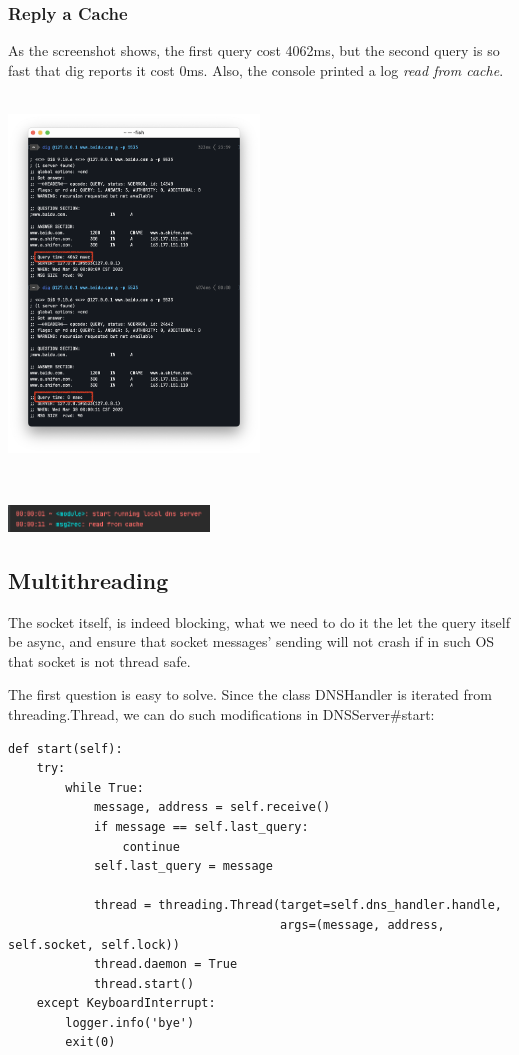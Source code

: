 \documentclass[onecolumn, oneside, ctexart]{SUSTechHomework}
\begin{document}
\subsubsection{Reply a Cache}
\label{reply a cache}
As the screenshot shows, the first query cost 4062ms, but the second query is so fast that dig reports it cost 0ms. Also, the console printed a log \emph{read from cache}.\\~\\
\centerline{\includegraphics[width=0.5\textwidth]{fig/p112}}\\
\centerline{\includegraphics[width=0.4\textwidth]{fig/p113}}

\subsection{Multithreading}
The socket itself, is indeed blocking, what we need to do it the let the query itself be async, and ensure that socket messages' sending will not crash if in such OS that socket is not thread safe.
\par The first question is easy to solve. Since the class DNSHandler is iterated from threading.Thread, we can do such modifications in DNSServer\#start:
\begin{verbatim}
def start(self):
    try:
        while True:
            message, address = self.receive()
            if message == self.last_query:
                continue
            self.last_query = message

            thread = threading.Thread(target=self.dns_handler.handle,
                                      args=(message, address, self.socket, self.lock))
            thread.daemon = True
            thread.start()
    except KeyboardInterrupt:
        logger.info('bye')
        exit(0)
\end{verbatim}
\end{document}
